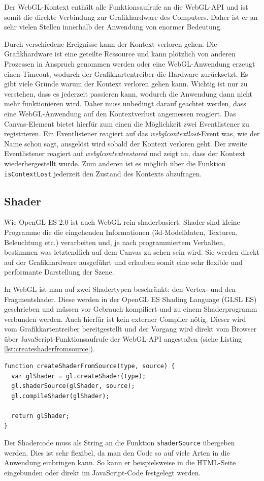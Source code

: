 Der WebGL-Kontext enthält alle Funktionsaufrufe an die WebGL-API und ist somit die direkte Verbindung zur Grafikhardware des Computers. Daher ist er an sehr vielen Stellen innerhalb der Anwendung von enormer Bedeutung.

Durch verschiedene Ereignisse kann der Kontext verloren gehen. Die Grafikhardware ist eine geteilte Ressource und kann plötzlich von anderen Prozessen in Anspruch genommen werden oder eine WebGL-Anwendung erzeugt einen Timeout, wodurch der Grafikkartentreiber die Hardware zurücksetzt. Es gibt viele Gründe warum der Kontext verloren gehen kann. Wichtig ist nur zu verstehen, dass es jederzeit passieren kann, wodurch die Anwendung dann nicht mehr funktionieren wird. Daher muss unbedingt darauf geachtet werden, dass eine WebGL-Anwendung auf den Kontextverlust angemessen reagiert. Das Canvas-Element bietet hierfür zum einen die Möglichkeit zwei Eventlistener zu registrieren. Ein Eventlistener reagiert auf das \textit{webglcontextlost}-Event was, wie der Name schon sagt, ausgelöst wird sobald der Kontext verloren geht. Der zweite Eventlistener reagiert auf \textit{webglcontextrestored} und zeigt an, dass der Kontext wiederhergestellt wurde. Zum anderen ist es möglich über die Funktion \texttt{isContextLost} jederzeit den Zustand des Kontexts abzufragen.

\subsection{Shader}
Wie OpenGL ES 2.0 ist auch WebGL rein shaderbasiert. Shader sind kleine Programme die die eingehenden Informationen (3d-Modelldaten, Texturen, Beleuchtung etc.) verarbeiten und, je nach programmiertem Verhalten, bestimmen was letztendlich auf dem Canvas zu sehen sein wird. Sie werden direkt auf der Grafikhardware ausgeführt und erlauben somit eine sehr flexible und performante Darstellung der Szene.

In WebGL ist man auf zwei Shadertypen beschränkt: den Vertex- und den Fragmentshader. Diese werden in der OpenGL ES Shading Language (GLSL ES) geschrieben und müssen vor Gebrauch kompiliert und zu einem Shaderprogramm verbunden werden. Auch hierfür ist kein externer Compiler nötig. Dieser wird vom Grafikkartentreiber bereitgestellt und der Vorgang wird direkt vom Browser über JavaScript-Funktionsaufrufe der WebGL-API angestoßen (siehe Listing \ref{lst:createshaderfromsource}).
\lstset{language=JavaScript}
\begin{lstlisting}[caption={Erstellen eines Shaders (selbstgeschriebene Funktion)}, label={lst:createshaderfromsource}]
function createShaderFromSource(type, source) {
  var glShader = gl.createShader(type);
  gl.shaderSource(glShader, source);
  gl.compileShader(glShader);

  return glShader;
}
\end{lstlisting}
Der Shadercode muss als String an die Funktion \texttt{shaderSource} übergeben werden. Dies ist sehr flexibel, da man den Code so auf viele Arten in die Anwendung einbringen kann. So kann er beispielsweise in die HTML-Seite eingebunden oder direkt im JavaScript-Code festgelegt werden.

